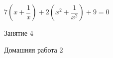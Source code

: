 \begin{class}[number=3]
	\begin{listofex}
		\item \( 7\left( x+\dfrac{1}{x} \right)+2\left( x^2+\dfrac{1}{x^2} \right)+9=0 \)
	\end{listofex}
\end{class}

\begin{class}[number=4]
	\begin{listofex}
		\item Занятие 4
	\end{listofex}
\end{class}

\begin{homework}[number=2]
	\begin{listofex}
		\item Домашняя работа 2
	\end{listofex}
\end{homework}

